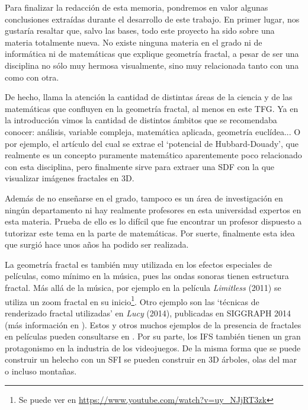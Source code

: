%
%

Para finalizar la redacción de esta memoria, pondremos en valor algunas conclusiones extraídas durante el desarrollo de este trabajo. En primer lugar, nos gustaría resaltar que, salvo las bases, todo este proyecto ha sido sobre una materia totalmente nueva. No existe ninguna materia en el grado ni de informática ni de matemáticas que explique geometría fractal, a pesar de ser una disciplina no sólo muy hermosa visualmente, sino muy relacionada tanto con una como con otra.

De hecho, llama la atención la cantidad de distintas áreas de la ciencia y de las matemáticas que confluyen en la geometría fractal, al menos en este TFG. Ya en la introducción vimos la cantidad de distintos ámbitos que se recomendaba conocer: análisis, variable compleja, matemática aplicada, geometría euclídea... O por ejemplo, el artículo \cite{Hubbard-Douady} del cual se extrae el `potencial de Hubbard-Douady', que realmente es un concepto puramente matemático aparentemente poco relacionado con esta disciplina, pero finalmente sirve para extraer una SDF con la que visualizar imágenes fractales en 3D.

Además de no enseñarse en el grado, tampoco es un área de investigación en ningún departamento ni hay realmente profesores en esta universidad expertos en esta materia. Prueba de ello es lo difícil que fue encontrar un profesor dispuesto a tutorizar este tema en la parte de matemáticas. Por suerte, finalmente esta idea que surgió hace unos años ha podido ser realizada.

La geometría fractal es también muy utilizada en los efectos especiales de películas, como mínimo en la música, pues las ondas sonoras tienen estructura fractal. Más allá de la música, por ejemplo en la película \textit{Limitless} (2011) se utiliza un zoom fractal en su inicio\footnote{Se puede ver en \url{https://www.youtube.com/watch?v=uy_NJjRT3zk}}. Otro ejemplo son las `técnicas de renderizado fractal utilizadas' en \textit{Lucy} (2014), publicadas en SIGGRAPH 2014 (más información en \cite{SIGGRAPH-2014}). Estos y otros muchos ejemplos de la presencia de fractales en películas pueden consultarse en \cite{fractals-films}. Por su parte, los IFS también tienen un gran protagonismo en la industria de los videojuegos. De la misma forma que se puede construir un helecho con un SFI se pueden construir en 3D árboles, olas del mar o incluso montañas. 

